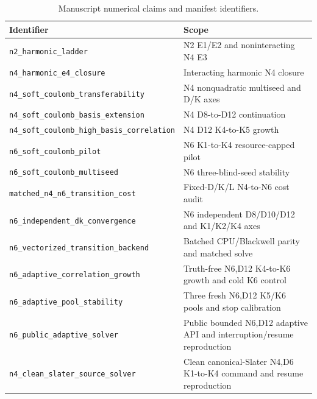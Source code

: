 \documentclass[11pt]{article}
\newcommand{\claimid}[1]{\nolinkurl{#1}}
\begin{document}
\begin{table}[h]
\centering
\caption{Manuscript numerical claims and manifest identifiers.}
\begin{tabularx}{\textwidth}{lY}
\toprule
Identifier & Scope \\
\midrule
\claimid{n2_harmonic_ladder} & N2 E1/E2 and noninteracting N4 E3 \\
\claimid{n4_harmonic_e4_closure} & Interacting harmonic N4 closure \\
\claimid{n4_soft_coulomb_transferability} & N4 nonquadratic multiseed and D/K axes \\
\claimid{n4_soft_coulomb_basis_extension} & N4 D8-to-D12 continuation \\
\claimid{n4_soft_coulomb_high_basis_correlation} & N4 D12 K4-to-K5 growth \\
\claimid{n6_soft_coulomb_pilot} & N6 K1-to-K4 resource-capped pilot \\
\claimid{n6_soft_coulomb_multiseed} & N6 three-blind-seed stability \\
\claimid{matched_n4_n6_transition_cost} & Fixed-D/K/L N4-to-N6 cost audit \\
\claimid{n6_independent_dk_convergence} & N6 independent D8/D10/D12 and K1/K2/K4 axes \\
\claimid{n6_vectorized_transition_backend} & Batched CPU/Blackwell parity and matched solve \\
\claimid{n6_adaptive_correlation_growth} & Truth-free N6,D12 K4-to-K6 growth and cold K6 control \\
\claimid{n6_adaptive_pool_stability} & Three fresh N6,D12 K5/K6 pools and stop calibration \\
\claimid{n6_public_adaptive_solver} & Public bounded N6,D12 adaptive API and interruption/resume reproduction \\
\claimid{n4_clean_slater_source_solver} & Clean canonical-Slater N4,D6 K1-to-K4 command and resume reproduction \\
\bottomrule
\end{tabularx}
\end{table}

\begingroup
\footnotesize


\endgroup
\end{document}
